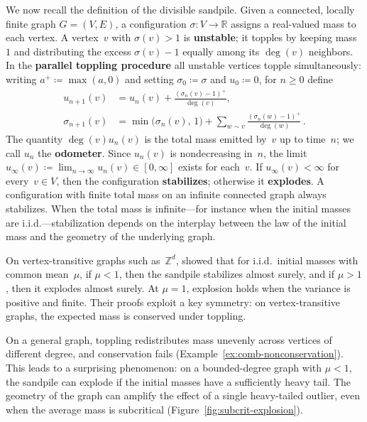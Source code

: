 \documentclass[aop]{imsart}
\theoremstyle{plain}
\theoremstyle{definition}
\newcommand{\Z}{\mathbb{Z}}
\newcommand{\R}{\mathbb{R}}
\begin{document}
	We now recall the definition of the divisible sandpile. Given a connected, locally finite graph $G=(V,E)$, a configuration $\sigma\colon V \to \R$ assigns a real-valued mass to each vertex. A vertex~$v$ with $\sigma(v)>1$ is \textbf{unstable}; it topples by keeping mass~$1$ and distributing the excess $\sigma(v) - 1$ equally among its $\deg(v)$ neighbors. In the \textbf{parallel toppling procedure} all unstable vertices topple simultaneously: writing $a^+\coloneqq\max(a,0)$ and setting $\sigma_0 \coloneqq \sigma$ and $u_0 \coloneqq 0$, for $n \geq 0$ define
	\begin{align}
		u_{n+1}(v) &= u_n(v) + \frac{(\sigma_n(v) - 1)^+}{\deg(v)}, \label{eq:u-update} \\
		\sigma_{n+1}(v) &= \min\bigl(\sigma_n(v),\,1\bigr) + \sum_{w \sim v} \frac{(\sigma_n(w)-1)^+}{\deg(w)}\,. \label{eq:sigma-update}
	\end{align}
	The quantity $\deg(v) u_n(v)$ is the total mass emitted by~$v$ up to time~$n$; we call $u_n$ the \textbf{odometer}. Since $u_n(v)$ is nondecreasing in~$n$, the limit $u_\infty(v) \coloneqq \lim_{n \to \infty} u_n(v) \in [0, \infty]$ exists for each~$v$.
	If $u_\infty(v) < \infty$ for every~$v \in V$, then the configuration \textbf{stabilizes}; otherwise it \textbf{explodes}. A configuration with finite total mass on an infinite connected graph always stabilizes. When the total mass is infinite---for instance when the initial masses are i.i.d.---stabilization depends on the interplay between the law of the initial mass and the geometry of the underlying graph. 
	
	On vertex-transitive graphs such as~$\Z^d$, \citet*{div-sand-crit} showed that for i.i.d.\ initial masses with common mean~$\mu$, if $\mu<1$, then the sandpile stabilizes almost surely, and if $\mu>1$, then it explodes almost surely. At $\mu=1$, explosion holds when the variance is positive and finite. Their proofs exploit a key symmetry: on vertex-transitive graphs, the expected mass is conserved under toppling.
	
	On a general graph, toppling redistributes mass unevenly across vertices of different degree, and conservation fails (Example~\ref{ex:comb-nonconservation}). This leads to a surprising phenomenon: on a bounded-degree graph with $\mu < 1$, the sandpile can explode if the initial masses have a sufficiently heavy tail. The geometry of the graph can amplify the effect of a single heavy-tailed outlier, even when the average mass is subcritical (Figure~\ref{fig:subcrit-explosion}).
	
\end{document}
